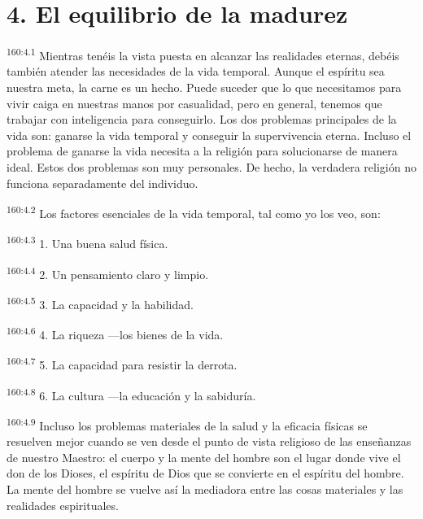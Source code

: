 \section*{4. El equilibrio de la madurez}
\par 
\textsuperscript{160:4.1} Mientras tenéis la vista puesta en alcanzar las realidades eternas, debéis también atender las necesidades de la vida temporal. Aunque el espíritu sea nuestra meta, la carne es un hecho. Puede suceder que lo que necesitamos para vivir caiga en nuestras manos por casualidad, pero en general, tenemos que trabajar con inteligencia para conseguirlo. Los dos problemas principales de la vida son: ganarse la vida temporal y conseguir la supervivencia eterna. Incluso el problema de ganarse la vida necesita a la religión para solucionarse de manera ideal. Estos dos problemas son muy personales. De hecho, la verdadera religión no funciona separadamente del individuo.

\par 
\textsuperscript{160:4.2} Los factores esenciales de la vida temporal, tal como yo los veo, son:

\par 
\textsuperscript{160:4.3} 1. Una buena salud física.

\par 
\textsuperscript{160:4.4} 2. Un pensamiento claro y limpio.

\par 
\textsuperscript{160:4.5} 3. La capacidad y la habilidad.

\par 
\textsuperscript{160:4.6} 4. La riqueza ---los bienes de la vida.

\par 
\textsuperscript{160:4.7} 5. La capacidad para resistir la derrota.

\par 
\textsuperscript{160:4.8} 6. La cultura ---la educación y la sabiduría.

\par 
\textsuperscript{160:4.9} Incluso los problemas materiales de la salud y la eficacia físicas se resuelven mejor cuando se ven desde el punto de vista religioso de las enseñanzas de nuestro Maestro: el cuerpo y la mente del hombre son el lugar donde vive el don de los Dioses, el espíritu de Dios que se convierte en el espíritu del hombre. La mente del hombre se vuelve así la mediadora entre las cosas materiales y las realidades espirituales.

